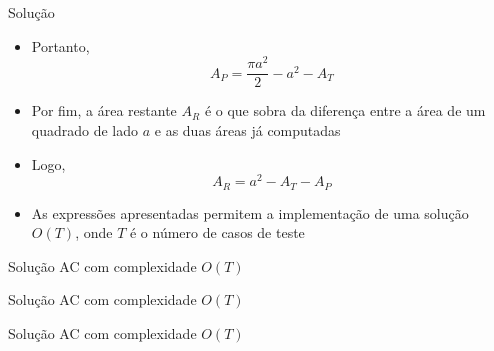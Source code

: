 \begin{frame}[fragile]{Solução}

    \begin{itemize}
        \item Portanto,
        \[
            A_P = \frac{\pi a^2}{2} - a^2 - A_T
        \]

        \item Por fim, a área restante $A_R$ é o que sobra da diferença entre a área de um
            quadrado de lado $a$ e as duas áreas já computadas

        \item Logo,
        \[
            A_R = a^2 - A_T - A_P
        \]

        \item As expressões apresentadas permitem a implementação de uma solução $O(T)$, onde
            $T$ é o número de casos de teste
    \end{itemize}

\end{frame}
\begin{frame}[fragile]{Solução AC com complexidade $O(T)$}
\end{frame}

\begin{frame}[fragile]{Solução AC com complexidade $O(T)$}
\end{frame}

\begin{frame}[fragile]{Solução AC com complexidade $O(T)$}
\end{frame}
